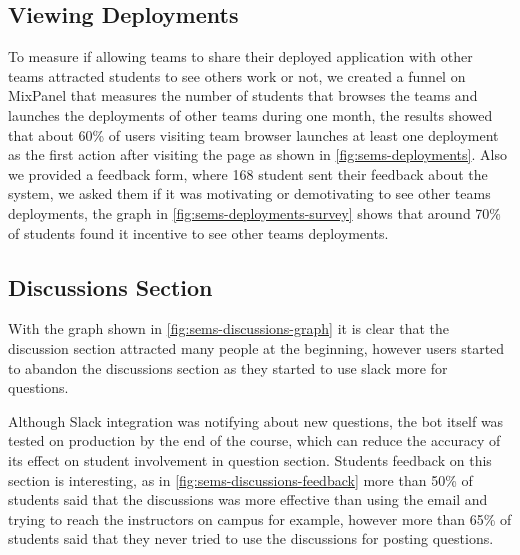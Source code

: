 \subsection{Viewing Deployments}
\label{sub:deployments-views}
To measure if allowing teams to share their deployed application with other teams attracted students to see others work or not, we created
a funnel on MixPanel\texttrademark{} that measures the number of students that browses the teams and launches the deployments of other teams during
one month, the results showed that about 60\% of users visiting team browser launches at least one deployment as the first action after visiting the
page as shown in \ref{fig:sems-deployments}. Also we provided a feedback form, where 168 student sent their feedback about the system, we
asked them if it was motivating or demotivating to see other teams deployments, the graph in \ref{fig:sems-deployments-survey} shows that around 70\%
of students found it incentive to see other teams deployments.

\subsection{Discussions Section}
\label{sub:discussions-stats}
With the graph shown in \ref{fig:sems-discussions-graph} it is clear that the discussion section attracted many people at the beginning,
however users started to abandon the discussions section as they started to use slack more for questions.

\newParagraph
Although Slack\texttrademark{} integration was notifying about new questions, the bot itself was tested on production by the end
of the course, which can reduce the accuracy of its effect on student involvement in question section. Students feedback on this
section is interesting, as in \ref{fig:sems-discussions-feedback} more than 50\% of students said that the discussions was more
effective than using the email and trying to reach the instructors on campus for example, however more than 65\% of students said
that they never tried to use the discussions for posting questions.


